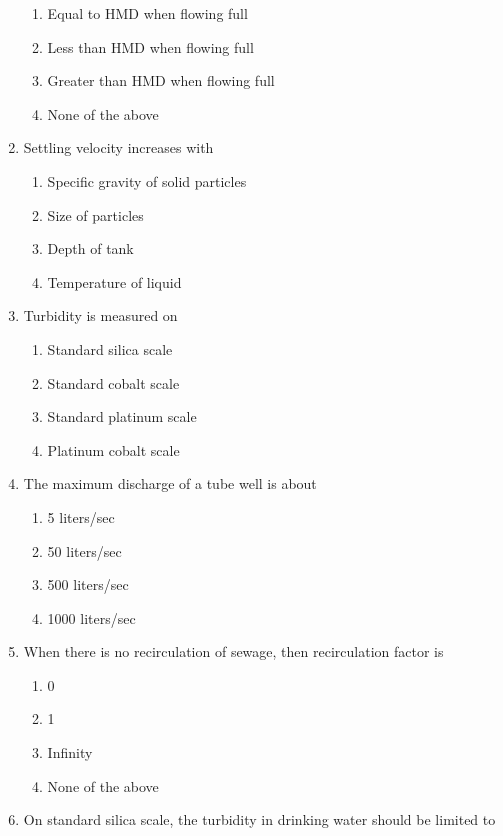 \documentclass[11pt,a4paper]{article}
\begin{document}
\begin{enumerate}
\begin{enumerate}[label=\Alph*.]
\item{Equal to HMD when flowing full}
\item{Less than HMD when flowing full}
\item{Greater than HMD when flowing full}
\item{None of the above}
\end{enumerate}
\item{Settling velocity increases with}
\begin{enumerate}[label=\Alph*.]
\item{Specific gravity of solid particles}
\item{Size of particles}
\item{Depth of tank}
\item{Temperature of liquid}
\end{enumerate}
\item{Turbidity is measured on}
\begin{enumerate}[label=\Alph*.]
\item{Standard silica scale}
\item{Standard cobalt scale}
\item{Standard platinum scale}
\item{Platinum cobalt scale}
\end{enumerate}
\item{The maximum discharge of a tube well is about}
\begin{enumerate}[label=\Alph*.]
\item{5 liters/sec}
\item{50 liters/sec}
\item{500 liters/sec}
\item{1000 liters/sec}
\end{enumerate}
\item{When there is no recirculation of sewage, then recirculation factor is}
\begin{enumerate}[label=\Alph*.]
\item{0}
\item{1}
\item{Infinity}
\item{None of the above}
\end{enumerate}
\item{On standard silica scale, the turbidity in drinking water should be limited to}
\\
\end{enumerate}
\end{document}
